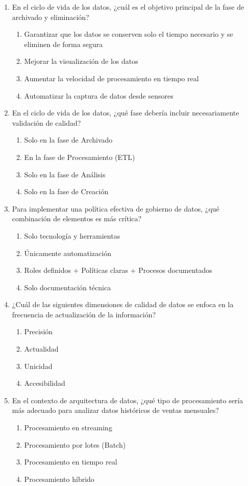 \documentclass[12pt]{article}
\begin{document}
\begin{enumerate}[label=\arabic*.]
\item En el ciclo de vida de los datos, ¿cuál es el objetivo principal de la fase de archivado y eliminación?
\begin{enumerate}
    \item Garantizar que los datos se conserven solo el tiempo necesario y se eliminen de forma segura
    \item Mejorar la visualización de los datos
    \item Aumentar la velocidad de procesamiento en tiempo real
    \item Automatizar la captura de datos desde sensores
\end{enumerate}

\item En el ciclo de vida de los datos, ¿qué fase debería incluir necesariamente validación de calidad?
\begin{enumerate}
    \item Solo en la fase de Archivado
    \item En la fase de Procesamiento (ETL)
    \item Solo en la fase de Análisis
    \item Solo en la fase de Creación
\end{enumerate}

\item Para implementar una política efectiva de gobierno de datos, ¿qué combinación de elementos es más crítica?
\begin{enumerate}
    \item Solo tecnología y herramientas
    \item Únicamente automatización
    \item Roles definidos + Políticas claras + Procesos documentados
    \item Solo documentación técnica
\end{enumerate}

\item ¿Cuál de las siguientes dimensiones de calidad de datos se enfoca en la frecuencia de actualización de la información?
\begin{enumerate}
    \item Precisión
    \item Actualidad
    \item Unicidad
    \item Accesibilidad
\end{enumerate}

\item En el contexto de arquitectura de datos, ¿qué tipo de procesamiento sería más adecuado para analizar datos históricos de ventas mensuales?
\begin{enumerate}
    \item Procesamiento en streaming
    \item Procesamiento por lotes (Batch)
    \item Procesamiento en tiempo real
    \item Procesamiento híbrido
\end{enumerate}


\end{enumerate}
\end{document}
